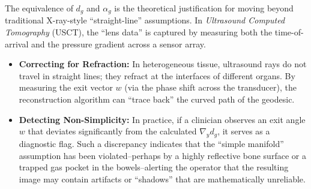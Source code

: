The equivalence of $d_g$ and $\alpha_g$ is the theoretical justification for moving beyond traditional X-ray-style ``straight-line'' assumptions. In \emph{Ultrasound Computed Tomography} (USCT), the ``lens data'' is captured by measuring both the time-of-arrival and the pressure gradient across a sensor array.
\begin{itemize}
    \item \textbf{Correcting for Refraction:} In heterogeneous tissue, ultrasound rays do not travel in straight lines; they refract at the interfaces of different organs. By measuring the exit vector $w$ (via the phase shift across the transducer), the reconstruction algorithm can ``trace back'' the curved path of the geodesic.
    \item \textbf{Detecting Non-Simplicity:} In practice, if a clinician observes an exit angle $w$ that deviates significantly from the calculated $\nabla_y d_g$, it serves as a diagnostic flag. Such a discrepancy indicates that the ``simple manifold'' assumption has been violated--perhaps by a highly reflective bone surface or a trapped gas pocket in the bowels--alerting the operator that the resulting image may contain artifacts or ``shadows'' that are mathematically unreliable.
\end{itemize}
